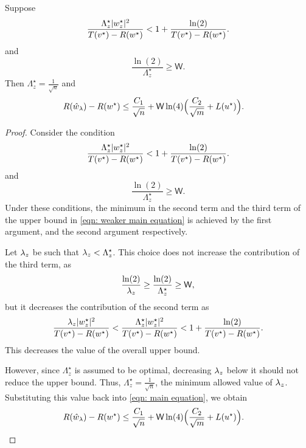 \begin{corollary}\label{cor: consequence of main theorem 2}
Suppose
    \begin{equation*}
        \frac{\Lambda_z^\star|w^\star_z|^2}{T(v^\star) - R(w^\star)} < 1+\frac{\ln(2)}{T(v^\star) - R(w^\star)}.
    \end{equation*}
and
    \begin{equation*}
        \frac{\ln(2)}{\Lambda_z^\star} \geq \mathsf{W}.
    \end{equation*}
Then $\Lambda_z^\star = \frac{1}{\sqrt{n}}$ and
    \begin{equation*}
    \begin{aligned}
        R(\hat{w}_\lambda) - R(w^\star) &\leq \frac{C_1}{\sqrt{n}} + \mathsf{W}\ln(4)\Big(\frac{C_2}{\sqrt{m}} + L(u^\star)\Big).
        \end{aligned}
    \end{equation*}
\end{corollary}

\begin{proof}
Consider the condition
    \begin{equation*}
        \frac{\Lambda_z^\star|w^\star_z|^2}{T(v^\star) - R(w^\star)} < 1+\frac{\ln(2)}{T(v^\star) - R(w^\star)}.
    \end{equation*}
and
    \begin{equation*}
        \frac{\ln(2)}{\Lambda_z^\star} \geq \mathsf{W}.
    \end{equation*}
Under these conditions, the minimum in the second term and the third term of the upper bound in \eqref{eqn: weaker main equation} is achieved by the first argument, and the second argument respectively.

Let $\lambda_z$ be such that $\lambda_z < \Lambda_z^\star$.
This choice does not increase the contribution of the third term, as \begin{equation*}
        \frac{\ln(2)}{\lambda_z} \geq \frac{\ln(2)}{\Lambda_z^\star} \geq \mathsf{W},
    \end{equation*}
but it decreases the contribution of the second term as
    \begin{equation*}
        \frac{\lambda_z|w^\star_z|^2}{T(v^\star) - R(w^\star)}< \frac{\Lambda_z^\star|w^\star_z|^2}{T(v^\star) - R(w^\star)} < 1+\frac{\ln(2)}{T(v^\star) - R(w^\star)}.
    \end{equation*}
This decreases the value of the overall upper bound.

However, since $\Lambda_z^\star$ is assumed to be optimal, decreasing $\lambda_z$ below it should not reduce the upper bound. Thus, $\Lambda_z^\star = \frac{1}{\sqrt{n}}$, the minimum allowed value of $\lambda_z$. Substituting this value back into \eqref{eqn: main equation}, we obtain
    \begin{equation*}
    \begin{aligned}
        R(\hat{w}_\lambda) - R(w^\star) &\leq \frac{C_1}{\sqrt{n}} + \mathsf{W}\ln(4)\Big(\frac{C_2}{\sqrt{m}} + L(u^\star)\Big).
        \end{aligned}
    \end{equation*}

\end{proof}

